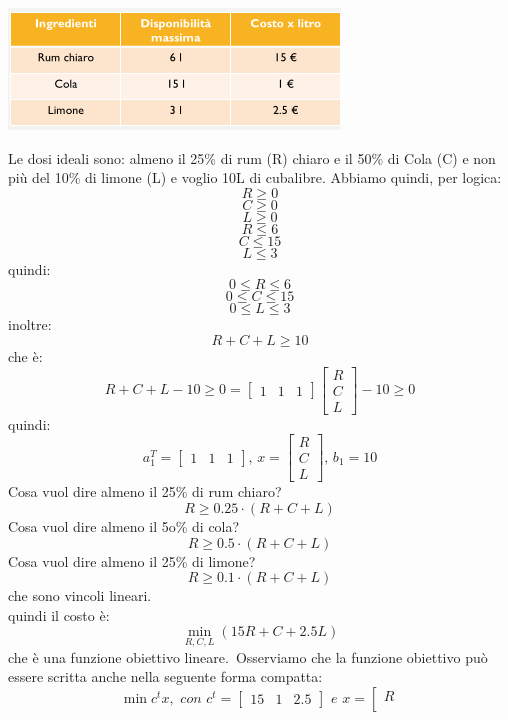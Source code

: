 \documentclass[a4paper,12pt, oneside]{book}
\begin{document}
\begin{esempio}
  \begin{center}
    \includegraphics[scale = 0.7]{img/cub.png}
  \end{center}
  Le dosi ideali sono: almeno il 25\% di rum (R) chiaro e il 50\% di
  Cola (C) e non più del 10\% di limone (L) e voglio 10L di cubalibre. Abbiamo quindi, per logica:
  \[R\geq 0\]
  \[C\geq 0\]
  \[L\geq 0\]
  \[R\leq 6\]
  \[C\leq 15\]
  \[L\leq 3\]
  quindi:
  \[0\leq R\leq 6\]
  \[0\leq C\leq 15\]
  \[0\leq L\leq 3\]
  inoltre:
  \[R+C+L\geq 10\]
  che è:
  \[R+C+L -10\geq 0 = \left[
      \begin{matrix}
        1 & 1 & 1
      \end{matrix}
    \right]\left[
      \begin{matrix}
        R \\
        C \\
        L
      \end{matrix}
    \right] -10 \geq 0\]
  quindi:
  \[a_1^T= \left[
      \begin{matrix}
        1 & 1 & 1
      \end{matrix}
    \right], \,x =\left[
      \begin{matrix}
        R \\
        C \\
        L
      \end{matrix}
    \right],\, b_1=10 \]
  Cosa vuol dire almeno il 25\% di rum chiaro?
  \[R \geq 0.25 \cdot (R + C + L)\]
  Cosa vuol dire almeno il 5o\% di cola?
  \[R \geq 0.5 \cdot (R + C + L)\]
  Cosa vuol dire almeno il 25\% di limone?
  \[R \geq 0.1\cdot (R + C + L)\]
  che sono vincoli lineari.\\
  quindi il costo è:
  \[\min_{R,C,L}(15R+C+2.5L)\]
  che è una funzione obiettivo lineare.\
  Osserviamo che la funzione obiettivo può essere scritta anche nella
  seguente forma compatta:
  \[\min c^tx,\,\,con\,\,c^t=\left[
      \begin{matrix}
        15 & 1 & 2.5
      \end{matrix}
    \right]\,\,e\,\, x =\left[
      \begin{matrix}
        R \\

\end{matrix}\]
\end{esempio}
\end{document}
